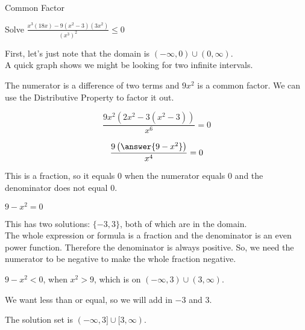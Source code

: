 \documentclass{ximera}
\begin{document}
\begin{example}  Common Factor


Solve $\frac{x^3 (18x) - 9(x^2-3)(3x^2)}{(x^3)^2} \leq 0$



\begin{explanation}

First, let's just note that the domain is $(-\infty, 0) \cup (0, \infty)$. \\

A quick graph shows we might be looking for two infinite intervals.



\begin{center}
\end{center}







The numerator is a difference of two terms and $9 x^2$ is a common factor.  We can use the Distributive Property to factor it out.



\[ \frac{9x^2 (2x^2 - 3(x^2-3))}{x^6} = 0 \]


\[ \frac{9 \left( \answer{9 - x^2} \right)}{x^4} = 0 \]



This is a fraction, so it equals $0$ when the numerator equals $0$ and the denominator does not equal $0$.


$9 - x^2 = 0$

This has two solutions: $\{ -3, 3  \}$, both of which are in the domain. \\


The whole expression or formula is a fraction and the denominator is an even power function. Therefore the denominator is always positive. So, we need the numerator to be negative to make the whole fraction negative.


$9 - x^2 < 0$, when $x^2 > 9$, which is on $(-\infty, 3) \cup (3, \infty)$.

We want less than or equal, so we will add in $-3$ and $3$.


The solution set is $(-\infty, 3] \cup [3, \infty)$.


\end{explanation}
\end{example}
\end{document}

